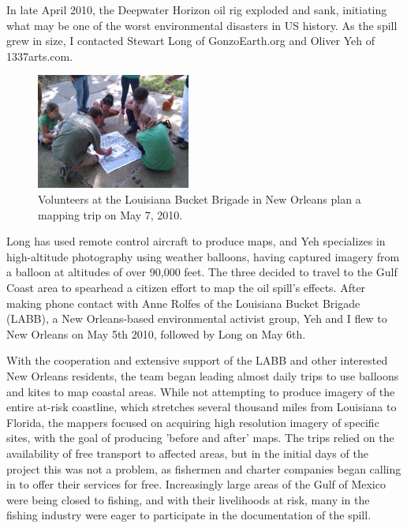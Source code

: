 \documentclass[11pt,oneside,notitlepage]{report}
\begin{document}
In late April 2010, the Deepwater Horizon oil rig exploded and sank, initiating what may be one of the worst environmental disasters in US history. As the spill grew in size, I contacted Stewart Long of GonzoEarth.org and Oliver Yeh of 1337arts.com. \begin{figure}
	\begin{flushright}
		\includegraphics[width=0.45\textwidth]{images/labb-planning.jpg}
		\caption{Volunteers at the Louisiana Bucket Brigade in New Orleans plan a mapping trip on May 7, 2010.}
	\end{flushright}
\end{figure}Long has used remote control aircraft to produce maps, and Yeh specializes in high-altitude photography using weather balloons, having captured imagery from a balloon at altitudes of over 90,000 feet. The three decided to travel to the Gulf Coast area to spearhead a citizen effort to map the oil spill's effects. After making phone contact with Anne Rolfes of the Louisiana Bucket Brigade (LABB), a New Orleans-based environmental activist group, Yeh and I flew to New Orleans on May 5th 2010, followed by Long on May 6th. 

With the cooperation and extensive support of the LABB and other interested New Orleans residents, the team began leading almost daily trips to use balloons and kites to map coastal areas. While not attempting to produce imagery of the entire at-risk coastline, which stretches several thousand miles from Louisiana to Florida, the mappers focused on acquiring high resolution imagery of specific sites, with the goal of producing 'before and after' maps. The trips relied on the availability of free transport to affected areas, but in the initial days of the project this was not a problem, as fishermen and charter companies began calling in to offer their services for free. Increasingly large areas of the Gulf of Mexico were being closed to fishing, and with their livelihoods at risk, many in the fishing industry were eager to participate in the documentation of the spill. 
\end{document}
